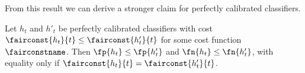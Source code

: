 %
From this result we can derive a stronger claim
for perfectly calibrated classifiers.
%
\begin{lemma}
  Let $h_t$ and $h'_t$ be perfectly calibrated classifiers with cost
  $\fairconst{h_t}{t} \leq \fairconst{h'_t}{t}$ for some
  cost function $\fairconstname$. Then $\fp{h_t} \leq \fp{h'_t}$
  and $\fn{h_t} \leq \fn{h'_t}$, with equality only if $\fairconst{h_t}{t} = \fairconst{h'_t}{t}$.
\end{lemma}
